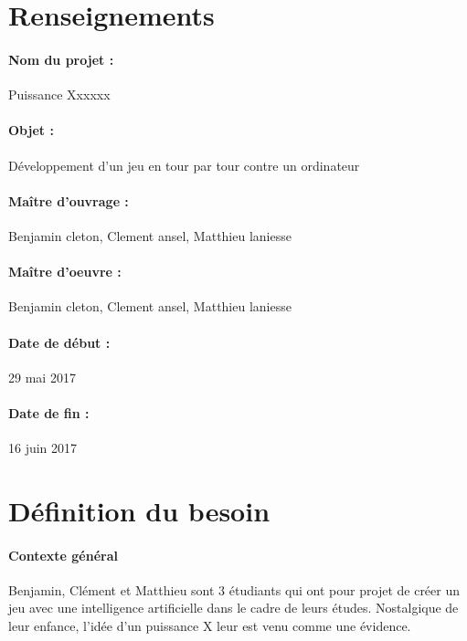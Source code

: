 \documentclass[a4paper,oneside]{article}
\title{\mytitle }
\author{Benjamin cleton, Clement ansel et Matthieu laniesse}
\date{29 mai 2017}
\begin{document}
\maketitle

\thispagestyle{fancyplain}



\section{Renseignements}

\paragraph{Nom du projet :}
Puissance Xxxxxx

\paragraph{Objet :}
Développement d'un jeu en tour par tour contre un ordinateur

\paragraph{Maître d'ouvrage :}
Benjamin cleton, Clement ansel, Matthieu laniesse

\paragraph{Maître d'oeuvre : }
Benjamin cleton, Clement ansel, Matthieu laniesse

\paragraph{Date de début :}
29 mai 2017

\paragraph{Date de fin :}
16 juin 2017



\newpage

\section{Définition du besoin}

\paragraph{Contexte général\\}
Benjamin, Clément et Matthieu sont 3 étudiants qui ont pour projet de créer un jeu avec une intelligence artificielle dans le cadre de leurs études.
Nostalgique de leur enfance, l'idée d'un puissance X leur est venu comme une évidence.
\end{document}
